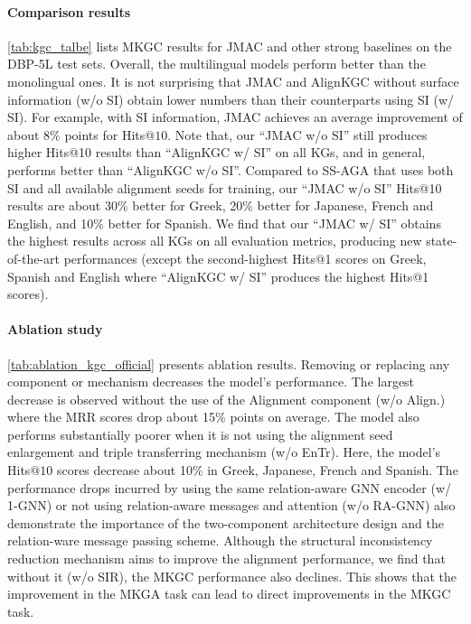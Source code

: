 \documentclass[11pt]{article}
\begin{document}
\paragraph{Comparison results} \autoref{tab:kgc_talbe} lists MKGC results for JMAC and other strong baselines on the DBP-5L test sets. 
Overall, the multilingual models perform better than the monolingual ones.
It is not surprising that  JMAC and AlignKGC without surface information (w/o SI) obtain lower numbers than their counterparts using SI (w/ SI). For example, with SI information, JMAC achieves an average improvement of about 8\% points for Hits@$10$. Note that, our ``{JMAC} w/o SI'' still produces higher Hits@10 results than ``AlignKGC w/ SI'' on all KGs, and in general, performs better than ``AlignKGC w/o SI''.  Compared to {SS-AGA} that uses both SI and all available alignment seeds for training, our ``{JMAC} w/o SI'' Hits@10 results are about 30\% better for Greek, 20\% better for Japanese, French and English, and 10\% better for Spanish. We find that our ``{JMAC} w/ SI''  obtains the highest results across all KGs on all evaluation metrics, producing new state-of-the-art performances (except the second-highest Hits@1 scores on Greek, Spanish and English where ``AlignKGC w/ SI'' produces the highest Hits@1 scores). 


\paragraph{Ablation study} \autoref{tab:ablation_kgc_official} presents ablation results. Removing or replacing any component or mechanism decreases the model's performance. 
The largest decrease is observed without the use of the Alignment component (w/o Align.) where the MRR scores drop about 15\% points on average. The model also performs substantially poorer when it is not using the alignment seed enlargement and triple transferring mechanism (w/o EnTr). Here, the model's Hits@$10$ scores decrease about 10\% in Greek, Japanese, French and Spanish. The performance drops incurred by using the same relation-aware GNN encoder (w/ 1-GNN) or not using relation-aware messages and attention (w/o RA-GNN) also demonstrate the importance of the two-component architecture design and the relation-ware message passing scheme. Although the structural inconsistency reduction mechanism aims to improve the alignment performance, we find that without it (w/o SIR), the MKGC performance also declines. This shows that the improvement in the MKGA task can lead to direct improvements in the MKGC task. 
\end{document}

